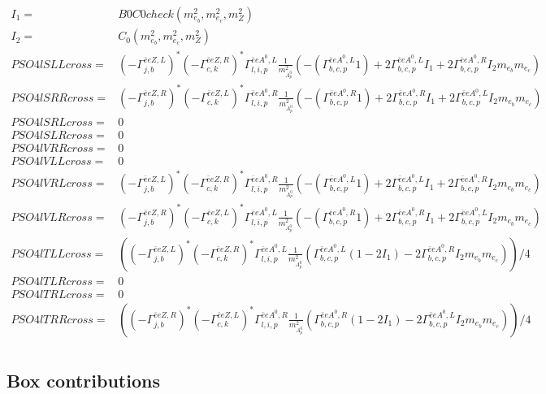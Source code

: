 \documentclass[A4,landscape]{article}
\begin{document}
\begin{align} 
I_1= & B0C0check(m^2_{e_{{b}}}, m^2_{e_{{c}}}, m^2_{Z}) \\ 
I_2= & C_0(m^2_{e_{{b}}}, m^2_{e_{{c}}}, m^2_{Z}) \\ 
  PSO4lSLLcross= &  (- \Gamma^{\bar{e}e Z ,L} _{j, b})^* (- \Gamma^{\bar{e}e Z ,R} _{c, k})^* \Gamma^{\bar{e}e A^0 ,L}_{l, i, p} \frac{1}{m^2_{A^0_{{p}}}} (-(\Gamma^{\bar{e}e A^0 ,L}_{b, c, p} 1) + 2 \Gamma^{\bar{e}e A^0 ,L}_{b, c, p} I_1 + 2 \Gamma^{\bar{e}e A^0 ,R}_{b, c, p} I_2 m_{e_{{b}}} m_{e_{{c}}}) \\ 
  PSO4lSRRcross= &  (- \Gamma^{\bar{e}e Z ,R} _{j, b})^* (- \Gamma^{\bar{e}e Z ,L} _{c, k})^* \Gamma^{\bar{e}e A^0 ,R}_{l, i, p} \frac{1}{m^2_{A^0_{{p}}}} (-(\Gamma^{\bar{e}e A^0 ,R}_{b, c, p} 1) + 2 \Gamma^{\bar{e}e A^0 ,R}_{b, c, p} I_1 + 2 \Gamma^{\bar{e}e A^0 ,L}_{b, c, p} I_2 m_{e_{{b}}} m_{e_{{c}}}) \\ 
  PSO4lSRLcross= & 0 \\ 
  PSO4lSLRcross= & 0 \\ 
  PSO4lVRRcross= & 0 \\ 
  PSO4lVLLcross= & 0 \\ 
  PSO4lVRLcross= &  (- \Gamma^{\bar{e}e Z ,L} _{j, b})^* (- \Gamma^{\bar{e}e Z ,R} _{c, k})^* \Gamma^{\bar{e}e A^0 ,R}_{l, i, p} \frac{1}{m^2_{A^0_{{p}}}} (-(\Gamma^{\bar{e}e A^0 ,L}_{b, c, p} 1) + 2 \Gamma^{\bar{e}e A^0 ,L}_{b, c, p} I_1 + 2 \Gamma^{\bar{e}e A^0 ,R}_{b, c, p} I_2 m_{e_{{b}}} m_{e_{{c}}}) \\ 
  PSO4lVLRcross= &  (- \Gamma^{\bar{e}e Z ,R} _{j, b})^* (- \Gamma^{\bar{e}e Z ,L} _{c, k})^* \Gamma^{\bar{e}e A^0 ,L}_{l, i, p} \frac{1}{m^2_{A^0_{{p}}}} (-(\Gamma^{\bar{e}e A^0 ,R}_{b, c, p} 1) + 2 \Gamma^{\bar{e}e A^0 ,R}_{b, c, p} I_1 + 2 \Gamma^{\bar{e}e A^0 ,L}_{b, c, p} I_2 m_{e_{{b}}} m_{e_{{c}}}) \\ 
  PSO4lTLLcross= & ( (- \Gamma^{\bar{e}e Z ,L} _{j, b})^* (- \Gamma^{\bar{e}e Z ,R} _{c, k})^* \Gamma^{\bar{e}e A^0 ,L}_{l, i, p} \frac{1}{m^2_{A^0_{{p}}}} (\Gamma^{\bar{e}e A^0 ,L}_{b, c, p} (1 - 2 I_1) - 2 \Gamma^{\bar{e}e A^0 ,R}_{b, c, p} I_2 m_{e_{{b}}} m_{e_{{c}}}))/4 \\ 
  PSO4lTLRcross= & 0 \\ 
  PSO4lTRLcross= & 0 \\ 
  PSO4lTRRcross= & ( (- \Gamma^{\bar{e}e Z ,R} _{j, b})^* (- \Gamma^{\bar{e}e Z ,L} _{c, k})^* \Gamma^{\bar{e}e A^0 ,R}_{l, i, p} \frac{1}{m^2_{A^0_{{p}}}} (\Gamma^{\bar{e}e A^0 ,R}_{b, c, p} (1 - 2 I_1) - 2 \Gamma^{\bar{e}e A^0 ,L}_{b, c, p} I_2 m_{e_{{b}}} m_{e_{{c}}}))/4 \\ 
\end{align} 
\subsection{Box contributions} 
\end{document}
